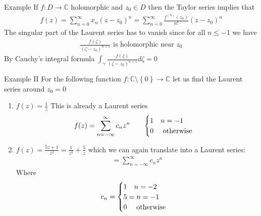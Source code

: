 \begin{parag}{Example}
    If $f : D \to \mathbb{C}$ holomorphic and $z_0 \in D$ then the Taylor series implies that
	\begin{align*} 
		f\left(z\right) = \sum_{n= 0}^{\infty}x_n\left(z - z_0\right)^{n} =  \sum_{n = 0}^{\infty}\frac{f^{\left(n\right)}\left(z_0\right)}{n!}\left(z - z_0\right)^{n}
	\end{align*}
	The singular part of the Laurent series has to vanish since for all $n \leq -1$ we have 
	\begin{align*} 
		\frac{f\left(\zeta\right)}{\left(\zeta - z_0\right)^{n + 1}} \text{ is holomorphic near } z_0
	\end{align*}
	By Cauchy's integral formula $\int_{\gamma}\frac{f\left(\zeta\right)}{\left(\zeta - z_0\right)^{n + 1}}d\zeta = 0$\\

\end{parag}
\begin{parag}{Example II}
    For the following function $f : \mathbb{C}\setminus \left\{0\right\} \to \mathbb{C}$ let us find the Laurent series around $z_0 = 0$
	\begin{enumerate}
	    \item $f\left(z\right) =  \frac{1}{z}$ This is already a Laurent series 
			\begin{align*} f\left(z\right) =  \sum_{n =  -\infty}^{\infty}c_nz^{n} \mathspace \mathspace \begin{cases}
			1 \mathspace n = -1\\
			0 \mathspace \text{ otherwise}
			\end{cases}
			 \end{align*}
			 \item $f\left(z\right) = \frac{5z + 1}{z^2} = \frac{1}{z^2} + \frac{5}{z}$ which we can again translate into a Laurent series:
				 \begin{align*} 
					 = \sum_{n = -\infty}^{\infty}c_nz^{n} 
				 \end{align*}
				 Where 
				 \begin{align*} 
					 c_n =  \begin{cases}
					 	1 \quad n =  -2\\
						5 =  n = -1\\
						0 \quad \text{ otherwise}
					 \end{cases}
				 \end{align*}
	\end{enumerate}
	
\end{parag}







